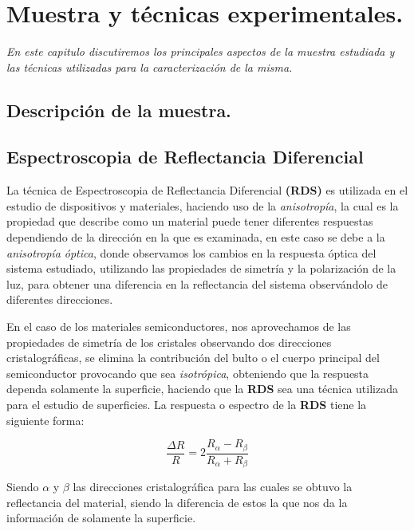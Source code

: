 \chapter{Muestra y técnicas experimentales.}

\label{chap:techniques-and-sample}
\textit{En este capitulo discutiremos los principales aspectos de la muestra estudiada y las técnicas utilizadas para la caracterización de la misma.}
\vfill
\minitoc
\newpage

\section{Descripción de la muestra.}
\label{sec:chap3-sample-description}
\newpage

\section{Espectroscopia de Reflectancia Diferencial}
\label{sec:chap3-rds}
La técnica de Espectroscopia de Reflectancia Diferencial \textbf{(RDS)} es utilizada en el estudio 
de dispositivos y materiales, haciendo uso de la \textit{anisotropía}, la cual es la propiedad que 
describe como un material puede tener diferentes respuestas dependiendo de la dirección en la que es examinada, 
en este caso se debe a la \textit{anisotropía óptica}, donde observamos los cambios en la respuesta óptica 
del sistema estudiado, utilizando las propiedades de simetría y la polarización de la luz, para obtener 
una diferencia en la reflectancia del sistema observándolo de diferentes direcciones.

En el caso de los materiales semiconductores, nos aprovechamos de las propiedades
de simetría de los cristales observando dos direcciones cristalográficas, se elimina
la contribución del bulto o el cuerpo principal del semiconductor provocando que sea \textit{isotrópica}, 
obteniendo que la respuesta dependa solamente la superficie, haciendo que la \textbf{RDS} sea una 
técnica utilizada para el estudio de superficies.\cite{Aspnes1985} La respuesta o espectro de la 
\textbf{RDS} tiene la siguiente forma:

\begin{equation}
    \label{eqn:ch3-rds-eqn}
    \dfrac{\Delta R}{R} = 2\dfrac{R_{\alpha}-R_{\beta}}{R_{\alpha}+R_{\beta}}
\end{equation}

Siendo $ \alpha $ y $ \beta $ las direcciones cristalográfica para las cuales se obtuvo la
reflectancia del material, siendo la diferencia de estos la que nos da la información de solamente la 
superficie.

